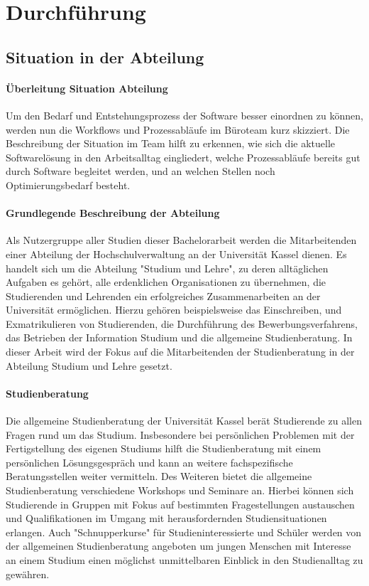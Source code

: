 \section{Durchführung}

\subsection{Situation in der Abteilung}

\paragraph{Überleitung Situation Abteilung}
Um den Bedarf und Entstehungsprozess der Software besser einordnen zu können,
werden nun die Workflows und Prozessabläufe im Büroteam kurz skizziert. Die
Beschreibung der Situation im Team hilft zu erkennen, wie sich die aktuelle
Softwarelösung in den Arbeitsalltag eingliedert, welche Prozessabläufe bereits
gut durch Software begleitet werden, und an welchen Stellen noch
Optimierungsbedarf besteht.

\paragraph{Grundlegende Beschreibung der Abteilung}
Als Nutzergruppe aller Studien dieser Bachelorarbeit werden die Mitarbeitenden
einer Abteilung der Hochschulverwaltung an der Universität Kassel dienen. Es
handelt sich um die Abteilung "Studium und Lehre", zu deren alltäglichen
Aufgaben es gehört, alle erdenklichen Organisationen zu übernehmen, die
Studierenden und Lehrenden ein erfolgreiches Zusammenarbeiten an der
Universität ermöglichen. Hierzu gehören beispielsweise das Einschreiben, und
Exmatrikulieren von Studierenden, die Durchführung des Bewerbungsverfahrens,
das Betrieben der Information Studium und die allgemeine Studienberatung. In
dieser Arbeit wird der Fokus auf die Mitarbeitenden der Studienberatung in der
Abteilung Studium und Lehre gesetzt.

\paragraph{Studienberatung}
Die allgemeine Studienberatung der Universität Kassel berät Studierende zu
allen Fragen rund um das Studium. Insbesondere bei persönlichen Problemen mit
der Fertigstellung des eigenen Studiums hilft die Studienberatung mit einem
persönlichen Lösungsgespräch und kann an weitere fachspezifische
Beratungsstellen weiter vermitteln. Des Weiteren bietet die allgemeine
Studienberatung verschiedene Workshops und Seminare an. Hierbei können sich
Studierende in Gruppen mit Fokus auf bestimmten Fragestellungen austauschen und
Qualifikationen im Umgang mit herausfordernden Studiensituationen erlangen.
Auch "Schnupperkurse" für Studieninteressierte und Schüler werden von der
allgemeinen Studienberatung angeboten um jungen Menschen mit Interesse an einem
Studium einen möglichst unmittelbaren Einblick in den Studienalltag zu
gewähren.\cite{studBeratungKsWeb}

